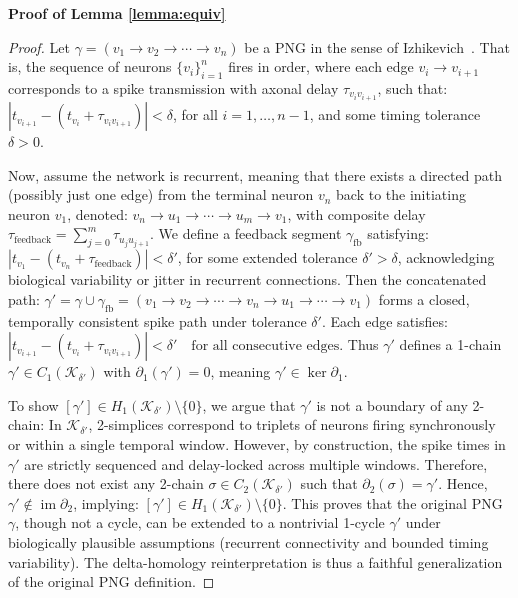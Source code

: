 \documentclass[lettersize,journal]{IEEEtran}
\begin{document}
\noindent\textbf{Proof of Lemma \ref{lemma:equiv}}

\begin{proof}
Let \( \gamma = (v_1 \to v_2 \to \cdots \to v_n) \) be a PNG in the sense of Izhikevich~\cite{izhikevich2006polychronization}. That is, the sequence of neurons \( \{v_i\}_{i=1}^n \) fires in order, where each edge \( v_i \to v_{i+1} \) corresponds to a spike transmission with axonal delay \( \tau_{v_i v_{i+1}} \), such that:
$|t_{v_{i+1}} - (t_{v_i} + \tau_{v_i v_{i+1}})| < \delta$,
for all \( i = 1, \dots, n-1 \), and some timing tolerance \( \delta > 0 \).

Now, assume the network is recurrent, meaning that there exists a directed path (possibly just one edge) from the terminal neuron \( v_n \) back to the initiating neuron \( v_1 \), denoted:
$v_n \to u_1 \to \cdots \to u_m \to v_1$,
with composite delay \( \tau_{\mathrm{feedback}} = \sum_{j=0}^{m} \tau_{u_j u_{j+1}} \). We define a feedback segment \( \gamma_{\mathrm{fb}} \) satisfying:
$|t_{v_1} - (t_{v_n} + \tau_{\mathrm{feedback}})| < \delta'$,
for some extended tolerance \( \delta' > \delta \), acknowledging biological variability or jitter in recurrent connections.
Then the concatenated path:
$\gamma' = \gamma \cup \gamma_{\mathrm{fb}} = (v_1 \to v_2 \to \cdots \to v_n \to u_1 \to \cdots \to v_1)$
forms a closed, temporally consistent spike path under tolerance \( \delta' \). Each edge satisfies:
$|t_{v_{i+1}} - (t_{v_i} + \tau_{v_i v_{i+1}})| < \delta' \quad \text{for all consecutive edges}$.
Thus \( \gamma' \) defines a 1-chain \( \gamma' \in C_1(\mathcal{K}_{\delta'}) \) with \( \partial_1(\gamma') = 0 \), meaning \( \gamma' \in \ker \partial_1 \).

To show \( [\gamma'] \in H_1(\mathcal{K}_{\delta'}) \setminus \{0\} \), we argue that \( \gamma' \) is not a boundary of any 2-chain: In \( \mathcal{K}_{\delta'} \), 2-simplices correspond to triplets of neurons firing synchronously or within a single temporal window.
However, by construction, the spike times in \( \gamma' \) are strictly sequenced and delay-locked across multiple windows.
Therefore, there does not exist any 2-chain \( \sigma \in C_2(\mathcal{K}_{\delta'}) \) such that \( \partial_2(\sigma) = \gamma' \).
Hence, \( \gamma' \notin \operatorname{im} \partial_2 \), implying:
$[\gamma'] \in H_1(\mathcal{K}_{\delta'}) \setminus \{0\}$.
This proves that the original PNG \( \gamma \), though not a cycle, can be extended to a nontrivial 1-cycle \( \gamma' \) under biologically plausible assumptions (recurrent connectivity and bounded timing variability). The delta-homology reinterpretation is thus a faithful generalization of the original PNG definition.
\end{proof}
\end{document}
